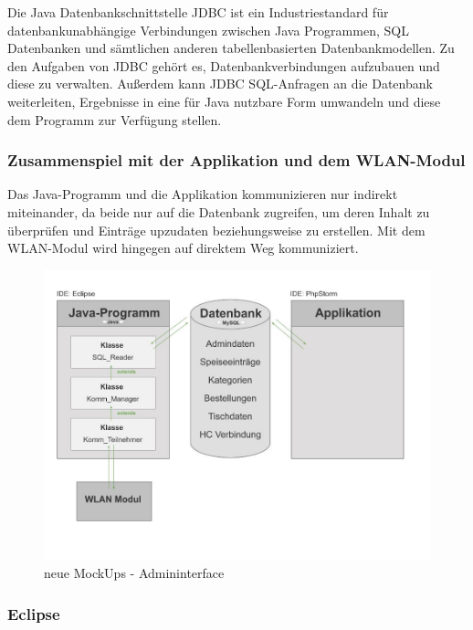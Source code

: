 Die Java Datenbankschnittstelle {JDBC\cite{jdbc}} ist ein Industriestandard für datenbankunabhängige Verbindungen zwischen Java Programmen, SQL Datenbanken und sämtlichen anderen tabellenbasierten Datenbankmodellen. Zu den Aufgaben von JDBC gehört es, Datenbankverbindungen aufzubauen und diese zu verwalten. Außerdem kann JDBC  SQL-Anfragen an die Datenbank weiterleiten, Ergebnisse in eine für Java nutzbare Form umwandeln und diese dem Programm zur Verfügung stellen.

	   \subsubsection{Zusammenspiel mit der Applikation und dem WLAN-Modul}
Das Java-Programm und die Applikation kommunizieren nur indirekt miteinander, da beide nur auf die Datenbank zugreifen, um deren Inhalt zu überprüfen und Einträge upzudaten beziehungsweise zu erstellen.
Mit dem WLAN-Modul wird hingegen auf direktem Weg kommuniziert.
			\begin{figure}[H]
			\begin{centering}
			\includegraphics[width = 1\textwidth]{Bilder/Jok_zusammenspiel_java.jpg}
			\par\end{centering}
			\caption{neue MockUps - Admininterface}
			\label{neue MockUps - Admininterface}
			\end{figure}
			
      \subsubsection{Eclipse}

